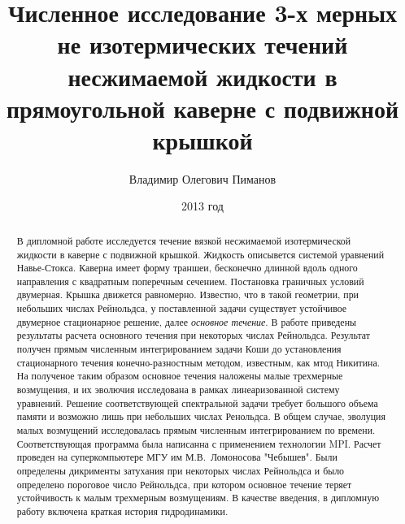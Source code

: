 \documentclass[a4paper,10pt]{article}
\title{Численное исследование 3-х мерных не изотермических течений несжимаемой жидкости в прямоугольной каверне с подвижной крышкой}
\author{Владимир Олегович Пиманов}
\date{2013 год}
\begin{document}

 \maketitle

\begin{abstract}
  В дипломной работе исследуется течение вязкой несжимаемой изотермической жидкости в каверне с подвижной крышкой. 
  Жидкость описывется системой уравнений Навье-Стокса. Каверна имеет форму траншеи, бесконечно длинной 
  вдоль одного направления с квадратным поперечным сечением. Постановка граничных условий двумерная. 
  Крышка движется равномерно. Известно, что в такой геометрии, при небольших числах Рейнольдса, у поставленной задачи
  существует устойчивое двумерное стационарное решение, далее \textit{основное течение}. В работе приведены результаты
  расчета основного течения при некоторых числах Рейнольдса. Результат получен прямым численным интегрированием задачи 
  Коши до установления стационарного течения конечно-разностным методом, известным, как мтод Никитина. 
  На полученое таким образом основное течения наложены малые 
  трехмерные возмущения, и их эволючия исследована в рамках линеаризованной систему уравнений. Решение 
  соответствующей спектральной задачи требует большого объема памяти и возможно лишь при небольших числах Ренольдса.
  В общем случае, эволуция малых возмущений исследовалась прямым численным интегрированием по времени. 
  Соответствующая программа была написанна с применением технологии MPI. Расчет проведен на суперкомпьютере 
  МГУ им М.В.~Ломоносова "Чебышев". Были определены дикрименты затухания при некоторых числах Рейнольдса и было 
  определено пороговое число Рейнольдса, при котором основное течение теряет устойчивость к малым трехмерным возмущениям. 
  В качестве введения, в дипломную работу включена краткая история гидродинамики.
\end{abstract}
\newpage  

  
  
  
  
  
  
  
  
\end{document}
